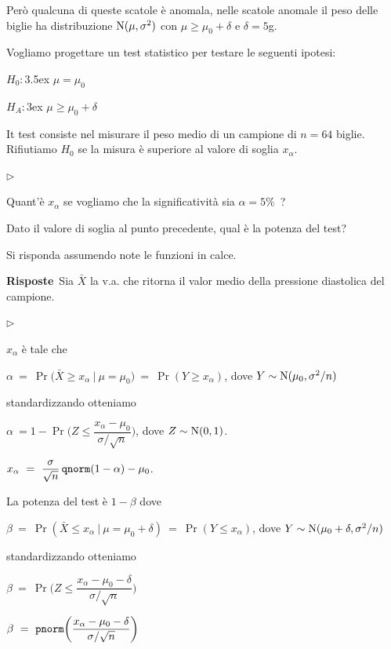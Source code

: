 \documentclass[11pt,openany]{book}
\newcommand{\mylabel}[1]{{\footnotesize\textsf{#1}}\hfill}
\renewenvironment{itemize}
  {\begin{list}{$\triangleright$}{%
   \setlength{\parskip}{0mm}
   \setlength{\topsep}{.2\baselineskip}
   \setlength{\rightmargin}{0mm}
   \setlength{\listparindent}{0mm}
   \setlength{\itemindent}{0mm}
   \setlength{\labelwidth}{3ex}
   \setlength{\itemsep}{.4\baselineskip}
   \setlength{\parsep}{0mm}
   \setlength{\partopsep}{0mm}
   \setlength{\labelsep}{1ex}
   \setlength{\leftmargin}{\labelwidth+\labelsep}
   \let\makelabel\mylabel}}{%
   \end{list}\vspace*{-1.3mm}}
\begin{document}
Però qualcuna di queste scatole è anomala, nelle scatole anomale il peso delle biglie ha distribuzione  ${\rm N}(\mu,\sigma^2)$ con $\mu\ge\mu_0+\delta$ e $\delta=5$g.

Vogliamo progettare un test statistico per testare le seguenti ipotesi:

$H_0:$\kern3.5ex $\mu=\mu_0$

$H_A:$\kern3ex $\mu\ge\mu_0+\delta$

It test consiste nel misurare il peso medio di un campione di $n=64$ biglie.
Rifiutiamo $H_0$ se la misura è superiore al valore di soglia $x_\alpha$. 

\begin{itemize}
\item[1.] Quant'è $x_\alpha$ se vogliamo che la significatività sia  $\alpha=5\%$~?

\item[2.] Dato il valore di soglia al punto precedente, qual è la potenza del test? 
\end{itemize}

Si risponda assumendo note le funzioni in calce.

\textbf{Risposte}\ 
 Sia $\bar X$ la v.a. che ritorna il valor medio della pressione diastolica del campione.


\begin{itemize}
  \item[1.] $x_\alpha$ è tale che \medskip

  $\alpha\ =\ \Pr\big(\bar X\ge x_\alpha\ \mathbin\big|\ \mu=\mu_0\big)\ =\ \Pr(Y\ge x_\alpha)$, dove $Y\sim {\rm N}(\mu_0,\sigma^2/n)$ \medskip

  standardizzando otteniamo \medskip

$\alpha\ = 1-\Pr\bigg(Z\le \dfrac{x_\alpha-\mu_0}{\sigma/\sqrt n}\bigg)$, dove $Z\sim {\rm N}(0,1)$.

\hfill $x_\alpha\ =\ \dfrac{\sigma}{\sqrt n}\,{\tt qnorm}(1-\alpha)-\mu_0$.

\item[2.] La potenza del test è $1-\beta$ dove\medskip

$\beta\ =\ \Pr(\bar X\le x_\alpha\ |\ \mu=\mu_0+\delta)\ =\ \Pr(Y\le x_\alpha)$, dove $Y\sim {\rm N}(\mu_0+\delta,\sigma^2/n)$\medskip

standardizzando otteniamo \medskip

$\beta\ =\ \Pr\bigg(Z\le  \dfrac{x_\alpha-\mu_0-\delta}{\sigma/\sqrt n}\bigg)$

\hfill$\beta\ =\  {\tt pnorm}\bigg(\dfrac{x_\alpha-\mu_0-\delta}{\sigma/\sqrt n}\bigg)$

\end{itemize}
\end{document}
